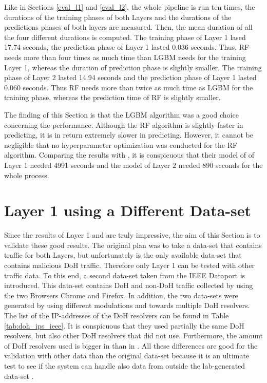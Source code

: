 Like in Sections \ref{eval_l1} and \ref{eval_l2}, the whole pipeline is run ten times, the durations of the training phases of both Layers and the durations of the predictions phases of both layers are measured. Then, the mean duration of all the four different durations is computed. The training phase of Layer 1 lased 17.74 seconds, the prediction phase of Layer 1 lasted 0.036 seconds. Thus, RF needs more than four times as much time than LGBM needs for the training Layer 1, whereas the duration of prediction phase is slightly smaller. The training phase of Layer 2 lasted 14.94 seconds and the prediction phase of Layer 1 lasted 0.060 seconds. Thus RF needs more than twice as much time as LGBM for the training phase, whereas the prediction time of RF is slightly smaller.

The finding of this Section is that the LGBM algorithm was a good choice concerning the performance. Although the RF algorithm is slightly faster in predicting, it is in return extremely slower in predicting. However, it cannot be negligible that no hyperparameter optimization was conducted for the RF algorithm. Comparing the results with \cite{BehnkeEtAl_FeatureEngineeringMLModelMaliciusDoHTraffic}, it is conspicuous that their model of of Layer 1 needed 4991 seconds and the model of Layer 2 needed 890 seconds for the whole process. 

\section{Layer 1 using a Different Data-set}
Since the results of Layer 1 and are truly impressive, the aim of this Section is to validate these good results. The original plan was to take a data-set that contains traffic for both Layers, but unfortunately \cite{CIRA-CIC-DoHBrw-2020} is the only available data-set that contains malicious DoH traffic. Therefore only Layer 1 can be tested with other traffic data. To this end, a second data-set taken from the IEEE Dataport \cite{ieee_dataset} is introduced. This data-set contains DoH and non-DoH traffic collected by using the two Browsers Chrome and Firefox. In addition, the two data-sets were generated by using different modulations and towards multiple DoH resolvers. The list of the IP-addresses of the DoH resolvers can be found in Table \ref{tab:doh_ips_ieee}. It is conspicuous that they used partially the same DoH resolvers, but also other DoH resolvers that \cite{CIRA-CIC-DoHBrw-2020} did not use. Furthermore, the amount of DoH resolvers used is bigger in \cite{ieee_dataset} than in \cite{CIRA-CIC-DoHBrw-2020}. All these differences are good for the validation with other data than the original data-set because it is an ultimate test to see if the system can handle also data from outside the lab-generated data-set \cite{CIRA-CIC-DoHBrw-2020}.

